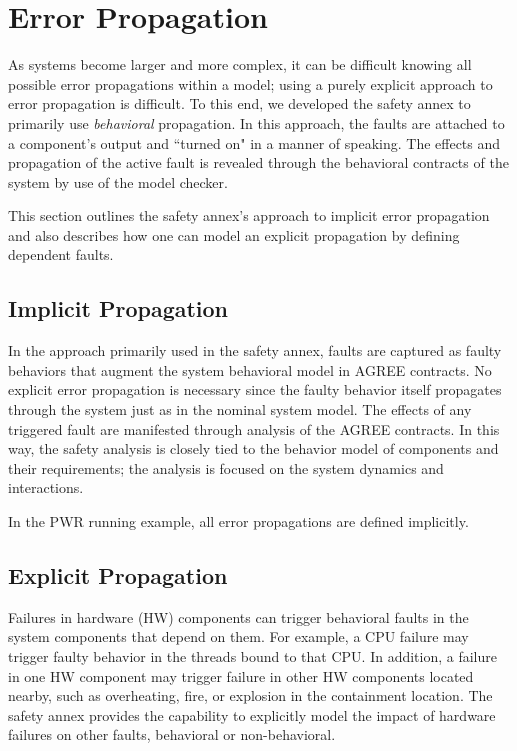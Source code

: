 \section{Error Propagation}
\label{sec:propogation}
As systems become larger and more complex, it can be difficult knowing all possible error propagations within a model; using a purely explicit approach to error propagation is difficult. To this end, we developed the safety annex to primarily use \textit{behavioral} propagation. In this approach, the faults are attached to a component's output and ``turned on" in a manner of speaking. The effects and propagation of the active fault is revealed through the behavioral contracts of the system by use of the model checker. 

This section outlines the safety annex's approach to implicit error propagation and also describes how one can model an explicit propagation by defining dependent faults. 

\subsection{Implicit Propagation}
In the approach primarily used in the safety annex, faults are captured as faulty behaviors that augment the system behavioral model in AGREE contracts. No explicit error propagation is necessary since the faulty behavior itself propagates through the system just as in the nominal system model. The effects of any triggered fault are manifested through analysis of the AGREE contracts. In this way, the safety analysis is closely tied to the behavior model of components and their requirements; the analysis is focused on the system dynamics and interactions. 

In the PWR running example, all error propagations are defined implicitly. 



\subsection{Explicit Propagation} 
Failures in hardware (HW) components can trigger behavioral faults in the system components that depend on them. For example, a CPU failure may trigger faulty behavior in the threads bound to that CPU. In addition, a failure in one HW component may trigger failure in other HW components located nearby, such as overheating, fire, or explosion
in the containment location. The safety annex provides the capability to explicitly model the impact of hardware failures on other faults, behavioral or non-behavioral. 

